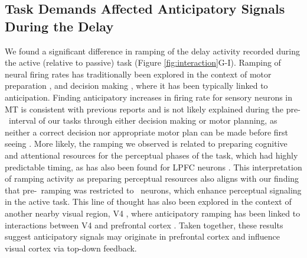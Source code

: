 \subsection*{Task Demands Affected Anticipatory Signals During the Delay}
We found a significant difference in ramping of the delay activity recorded during the active (relative to passive) task (Figure \ref{fig:interaction}G-I). Ramping of neural firing rates has traditionally been explored in the context of motor preparation \parencite{Ding2015, Narayanan2016}, and decision making \parencite{Shadlen2001}, where it has been typically linked to anticipation. Finding anticipatory increases in firing rate for sensory neurons in MT is consistent with previous reports \parencite{Bisley2004, Zaksas2006} and is not likely explained during the pre-\test\ interval of our tasks through either decision making or motor planning, as neither a correct decision nor appropriate motor plan can be made before first seeing \test . 
More likely, the ramping we observed is related to preparing cognitive and attentional resources for the perceptual phases of the task, which had highly predictable timing, as has also been found for LPFC neurons \parencite{Hussar2010, Hussar2013}. 
This interpretation of ramping activity as preparing perceptual resources also aligns with our finding that pre-\sample\ ramping was restricted to \enhanced\ neurons, which enhance perceptual signaling in the active task.
This line of thought has also been explored in the context of another nearby visual region, V4 \parencite{Snyder2018,Luck1997}, where anticipatory ramping has been linked to interactions between V4 and prefrontal cortex \parencite{Snyder2021}. 
Taken together, these results suggest anticipatory signals may originate in prefrontal cortex and influence visual cortex via top-down feedback.

